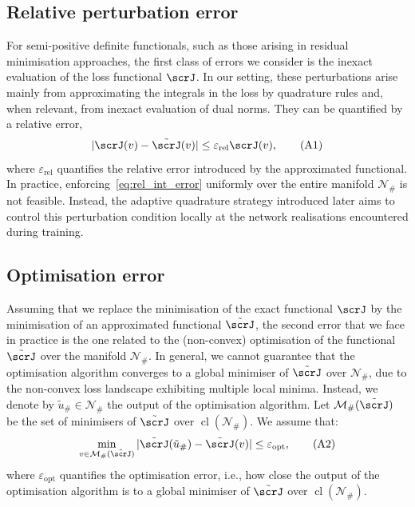 \documentclass[oneside,reqno,11pt,a4paper]{amsart}
\theoremstyle{definition}
\begin{document}
\subsection{Relative perturbation error} \label{subsec:rel-perturbation-error}

For semi-positive definite functionals, such as those arising in residual
minimisation approaches, the first class of errors we consider is the inexact
evaluation of the loss functional $\scrJ$. In our setting, these
perturbations arise mainly from approximating the integrals in the loss by
quadrature rules and, when relevant, from inexact evaluation of dual norms.
They can be quantified by a relative error,
\begin{equation}\label{eq:rel_int_error}
  |\scrJ(v) - \tilde{\scrJ}(v)| \leq \varepsilon_{\mathrm{rel}} \scrJ(v), %
  \tag{A1}
\end{equation}
where $\varepsilon_{\mathrm{rel}}$ quantifies the relative error introduced by
the approximated functional. In practice, enforcing~\eqref{eq:rel_int_error} uniformly over the entire manifold $\mathcal{N}_{\#}$
 is not feasible. Instead, the adaptive quadrature strategy introduced later aims to control this perturbation condition locally at the network realisations encountered during training.

\subsection{Optimisation error}

Assuming that we replace the minimisation of the exact functional $\scrJ$ by
the minimisation of an approximated functional $\tilde{\scrJ}$, the second
error that we face in practice is the one related to the (non-convex)
optimisation of the functional $\tilde{\scrJ}$ over the manifold
$\mathcal{N}_{\#}$. In general, we cannot guarantee that the optimisation
algorithm converges to a global minimiser of $\tilde{\scrJ}$ over
$\mathcal{N}_{\#}$, due to the non-convex loss landscape exhibiting multiple
local minima. Instead, we denote by $\tilde{u}_{\#} \in \mathcal{N}_{\#}$ the
output of the optimisation algorithm. Let $\mathcal{M}_{\#}(\tilde{\scrJ})$ be
the set of minimisers of $\tilde{\scrJ}$ over
$\operatorname{cl}(\mathcal{N}_{\#})$. We assume that:
\begin{equation}\label{eq:optimisation-error}
  \min_{v \in \mathcal{M}_{\#}(\tilde{\scrJ})} | \tilde{\scrJ}(\tilde{u}_{\#}) - \tilde{\scrJ}(v) | \leq \varepsilon_{\mathrm{opt}}, \tag{A2}
\end{equation}
where $\varepsilon_{\mathrm{opt}}$ quantifies the optimisation error, i.e., how
close the output of the optimisation algorithm is to a global minimiser of
$\tilde{\scrJ}$ over $\operatorname{cl}(\mathcal{N}_{\#})$. 
\end{document}
